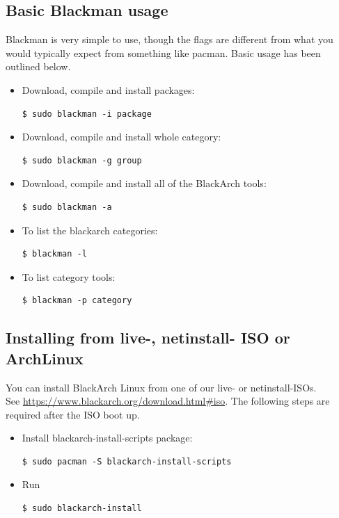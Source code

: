 \documentclass[a4paper, oneside, 11pt]{book}
\begin{document}
\subsection{Basic Blackman usage} Blackman is very simple to use, though the flags are different from what you
would typically expect from something like pacman. Basic usage has been outlined below.
\begin{itemize}
\item Download, compile and install packages:
{\small
\color{gray}
\begin{verbatim}
$ sudo blackman -i package
\end{verbatim}
}
\item Download, compile and install whole category:
{\small
\color{gray}
\begin{verbatim}
$ sudo blackman -g group
\end{verbatim}
}
\item Download, compile and install all of the BlackArch tools:
{\small
\color{gray}
\begin{verbatim}
$ sudo blackman -a
\end{verbatim}
}
\item To list the blackarch categories:
{\small
\color{gray}
\begin{verbatim}
$ blackman -l
\end{verbatim}
}
\item To list category tools:
{\small
\color{gray}
\begin{verbatim}
$ blackman -p category
\end{verbatim}
}
\end{itemize}

\subsection{Installing from live-, netinstall- ISO or ArchLinux}
You can install BlackArch Linux from one of our live- or netinstall-ISOs.\\See
\url{https://www.blackarch.org/download.html#iso}. The following steps are
required after the ISO boot up.
\begin{itemize}
\item Install blackarch-install-scripts package:
{\small
\color{gray}
\begin{verbatim}
$ sudo pacman -S blackarch-install-scripts
\end{verbatim}
}
\item Run
{\small
\color{gray}
\begin{verbatim}
$ sudo blackarch-install
\end{verbatim}
}
\end{itemize}
\end{document}

